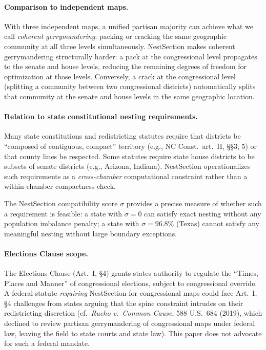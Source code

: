 \paragraph{Comparison to independent maps.}
With three independent maps, a unified partisan majority can achieve what
we call \emph{coherent gerrymandering}: packing or cracking the same
geographic community at all three levels simultaneously.  NestSection makes
coherent gerrymandering structurally harder: a pack at the congressional level
propagates to the senate and house levels, reducing the remaining degrees of
freedom for optimization at those levels.  Conversely, a crack at the
congressional level (splitting a community between two congressional districts)
automatically splits that community at the senate and house levels in the same
geographic location.

\paragraph{Relation to state constitutional nesting requirements.}
Many state constitutions and redistricting statutes require that districts be
``composed of contiguous, compact'' territory (e.g., NC Const.\ art.\ II, \S\S 3, 5)
or that county lines be respected.  Some statutes require state house districts
to be subsets of senate districts (e.g., Arizona, Indiana).  NestSection
operationalizes such requirements as a \emph{cross-chamber} computational
constraint rather than a within-chamber compactness check.

The NestSection compatibility score $\sigma$ provides a precise measure of
whether such a requirement is feasible: a state with $\sigma = 0$ can satisfy
exact nesting without any population imbalance penalty; a state with
$\sigma = 96.8\%$ (Texas) cannot satisfy any meaningful nesting without large
boundary exceptions.

\paragraph{Elections Clause scope.}
The Elections Clause (Art.\ I, \S4) grants states authority to regulate the
``Times, Places and Manner'' of congressional elections, subject to congressional
override.  A federal statute \emph{requiring} NestSection for congressional maps
could face Art.\ I, \S4 challenges from states arguing that the spine constraint
intrudes on their redistricting discretion (cf.\ \textit{Rucho v.\ Common Cause},
588 U.S.\ 684 (2019), which declined to review partisan gerrymandering of
congressional maps under federal law, leaving the field to state courts and
state law).  This paper does not advocate for such a federal mandate.

